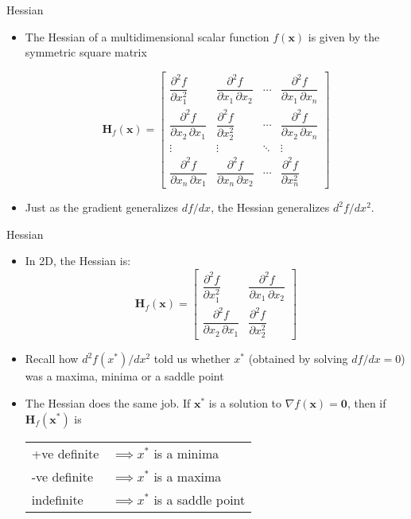 \documentclass[xcolor=dvipsnames,11pt]{beamer}
\begin{document}
\begin{frame}{Hessian}
	\begin{itemize}
		\item The Hessian of a multidimensional scalar function $f(\mathbf{x})$ is given by the symmetric square matrix
		
		$$\mathbf{H}_f(\mathbf{x}) = \begin{bmatrix}
		\dfrac{\partial^2 f}{\partial x_1^2} & \dfrac{\partial^2 f}{\partial x_1\,\partial x_2} & \cdots & \dfrac{\partial^2 f}{\partial x_1\,\partial x_n} \\[2.2ex]
		\dfrac{\partial^2 f}{\partial x_2\,\partial x_1} & \dfrac{\partial^2 f}{\partial x_2^2} & \cdots & \dfrac{\partial^2 f}{\partial x_2\,\partial x_n} \\[2.2ex]
		\vdots & \vdots & \ddots & \vdots \\[2.2ex]
		\dfrac{\partial^2 f}{\partial x_n\,\partial x_1} & \dfrac{\partial^2 f}{\partial x_n\,\partial x_2} & \cdots & \dfrac{\partial^2 f}{\partial x_n^2}
		\end{bmatrix}$$
		
		
		\item Just as the gradient generalizes $df/dx$, the Hessian generalizes $d^2f/dx^2$.
	\end{itemize}
\end{frame}

\begin{frame}{Hessian}
	\begin{itemize}
		\item In 2D, the Hessian is:
		$$\mathbf{H}_f(\mathbf{x}) = \begin{bmatrix}
		\dfrac{\partial^2 f}{\partial x_1^2} & \dfrac{\partial^2 f}{\partial x_1\,\partial x_2} \\
		\dfrac{\partial^2 f}{\partial x_2\,\partial x_1} & \dfrac{\partial^2 f}{\partial x_2^2}
		\end{bmatrix}$$
		\medskip
		
		\item Recall how $d^2f(x^*)/dx^2$ told us whether $x^*$ (obtained by solving $df/dx = 0$) was a maxima, minima or a saddle point
		\item The Hessian does the same job. If $\mathbf{x}^*$ is a solution to $\nabla f(\mathbf{x}) = \mathbf{0}$, then if $\mathbf{H}_f(\mathbf{x^*})$ is
		\begin{center}
			\begin{tabular}{ll}
				+ve definite & $\implies x^*$ is a minima \\
				-ve definite & $\implies x^*$ is a maxima \\
				indefinite & $\implies  x^*$ is a saddle point \\
			\end{tabular}
		\end{center}
		
	\end{itemize}
\end{frame}
\end{document}
